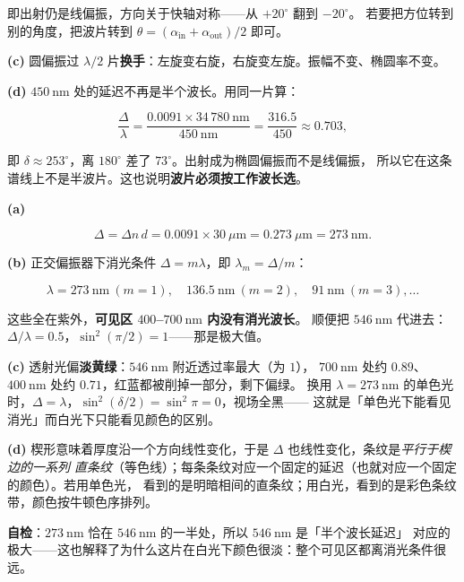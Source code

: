 \documentclass[11pt]{ctexart}
\begin{document}
即出射仍是线偏振，方向关于快轴对称——从 $+20^\circ$ 翻到 $-20^\circ$。
若要把方位转到别的角度，把波片转到 $\theta=(\alpha_{\text{in}}+\alpha_{\text{out}})/2$ 即可。

\textbf{(c)} 圆偏振过 $\lambda/2$ 片\textbf{换手}：左旋变右旋，右旋变左旋。振幅不变、椭圆率不变。

\textbf{(d)} $450\ \mathrm{nm}$ 处的延迟不再是半个波长。用同一片算：

\[
\frac{\Delta}{\lambda}=\frac{0.0091\times34\,780\ \mathrm{nm}}{450\ \mathrm{nm}}
=\frac{316.5}{450}\approx0.703,
\]

即 $\delta\approx253^\circ$，离 $180^\circ$ 差了 $73^\circ$。出射成为椭圆偏振而不是线偏振，
所以它在这条谱线上不是半波片。这也说明\textbf{波片必须按工作波长选}。


\textbf{(a)}

\[
\Delta=\Delta n\,d=0.0091\times30\ \mu\mathrm{m}=0.273\ \mu\mathrm{m}=273\ \mathrm{nm}.
\]

\textbf{(b)} 正交偏振器下消光条件 $\Delta=m\lambda$，即 $\lambda_m=\Delta/m$：

\[
\lambda=273\ \mathrm{nm}\ (m=1),\quad 136.5\ \mathrm{nm}\ (m=2),\quad 91\ \mathrm{nm}\ (m=3),\dots
\]

这些全在紫外，\textbf{可见区 $400$--$700\ \mathrm{nm}$ 内没有消光波长}。
顺便把 $546\ \mathrm{nm}$ 代进去：$\Delta/\lambda=0.5$，$\sin^2(\pi/2)=1$——那是极大值。

\textbf{(c)} 透射光偏\textbf{淡黄绿}：$546\ \mathrm{nm}$ 附近透过率最大（为 $1$），
$700\ \mathrm{nm}$ 处约 $0.89$、$400\ \mathrm{nm}$ 处约 $0.71$，红蓝都被削掉一部分，剩下偏绿。
换用 $\lambda=273\ \mathrm{nm}$ 的单色光时，$\Delta=\lambda$，$\sin^2(\delta/2)=\sin^2\pi=0$，视场全黑——
这就是「单色光下能看见消光」而白光下只能看见颜色的区别。

\textbf{(d)} 楔形意味着厚度沿一个方向线性变化，于是 $\Delta$ 也线性变化，条纹是\emph{平行于楔边的一系列
直条纹}（等色线）；每条条纹对应一个固定的延迟（也就对应一个固定的颜色）。若用单色光，
看到的是明暗相间的直条纹；用白光，看到的是彩色条纹带，颜色按牛顿色序排列。

\textbf{自检}：$273\ \mathrm{nm}$ 恰在 $546\ \mathrm{nm}$ 的一半处，所以 $546\ \mathrm{nm}$ 是「半个波长延迟」
对应的极大——这也解释了为什么这片在白光下颜色很淡：整个可见区都离消光条件很远。
\end{document}
